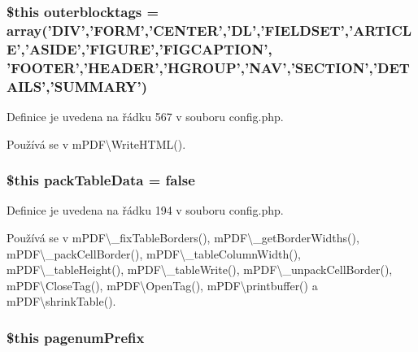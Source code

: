 \hypertarget{config_8php_ac0ca79c9726d84d36829204a5a64b232}{
\subsubsection[{outerblocktags}]{\setlength{\rightskip}{0pt plus 5cm}\$this outerblocktags = array('D\-I\-V','F\-O\-R\-M','C\-E\-N\-T\-E\-R','D\-L','F\-I\-E\-L\-D\-S\-E\-T','A\-R\-T\-I\-C\-L\-E','A\-S\-I\-D\-E','F\-I\-G\-U\-R\-E','F\-I\-G\-C\-A\-P\-T\-I\-O\-N', 'F\-O\-O\-T\-E\-R','H\-E\-A\-D\-E\-R','H\-G\-R\-O\-U\-P','N\-A\-V','S\-E\-C\-T\-I\-O\-N','D\-E\-T\-A\-I\-L\-S','S\-U\-M\-M\-A\-R\-Y')}}\label{config_8php_ac0ca79c9726d84d36829204a5a64b232}


Definice je uvedena na řádku 567 v souboru config.\-php.



Používá se v m\-P\-D\-F\textbackslash{}\-Write\-H\-T\-M\-L().

\hypertarget{config_8php_a96bae70a0455ce2669d778748f78b890}{
\subsubsection[{pack\-Table\-Data}]{\setlength{\rightskip}{0pt plus 5cm}\$this pack\-Table\-Data = {\bf false}}}\label{config_8php_a96bae70a0455ce2669d778748f78b890}


Definice je uvedena na řádku 194 v souboru config.\-php.



Používá se v m\-P\-D\-F\textbackslash{}\-\_\-fix\-Table\-Borders(), m\-P\-D\-F\textbackslash{}\-\_\-get\-Border\-Widths(), m\-P\-D\-F\textbackslash{}\-\_\-pack\-Cell\-Border(), m\-P\-D\-F\textbackslash{}\-\_\-table\-Column\-Width(), m\-P\-D\-F\textbackslash{}\-\_\-table\-Height(), m\-P\-D\-F\textbackslash{}\-\_\-table\-Write(), m\-P\-D\-F\textbackslash{}\-\_\-unpack\-Cell\-Border(), m\-P\-D\-F\textbackslash{}\-Close\-Tag(), m\-P\-D\-F\textbackslash{}\-Open\-Tag(), m\-P\-D\-F\textbackslash{}printbuffer() a m\-P\-D\-F\textbackslash{}shrink\-Table().

\hypertarget{config_8php_a9ad846e229cda78da8815c4af186fd74}{
\subsubsection[{pagenum\-Prefix}]{\setlength{\rightskip}{0pt plus 5cm}\$this pagenum\-Prefix}}\label{config_8php_a9ad846e229cda78da8815c4af186fd74}


